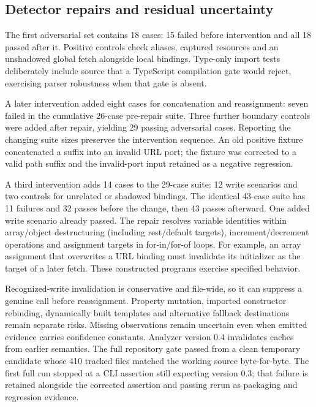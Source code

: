 \subsection{Detector repairs and residual uncertainty}
The first adversarial set contains 18 cases: 15 failed before intervention and all 18 passed after it. Positive controls check aliases, captured resources and an unshadowed global fetch alongside local bindings. Type-only import tests deliberately include source that a TypeScript compilation gate would reject, exercising parser robustness when that gate is absent.

A later intervention added eight cases for concatenation and reassignment: seven failed in the cumulative 26-case pre-repair suite. Three further boundary controls were added after repair, yielding 29 passing adversarial cases. Reporting the changing suite sizes preserves the intervention sequence. An old positive fixture concatenated a suffix into an invalid URL port; the fixture was corrected to a valid path suffix and the invalid-port input retained as a negative regression.

A third intervention adds 14 cases to the 29-case suite: 12 write scenarios and two controls for unrelated or shadowed bindings. The identical 43-case suite has 11 failures and 32 passes before the change, then 43 passes afterward. One added write scenario already passed. The repair resolves variable identities within array/object destructuring (including rest/default targets), increment/decrement operations and assignment targets in for-in/for-of loops. For example, an array assignment that overwrites a URL binding must invalidate its initializer as the target of a later fetch. These constructed programs exercise specified behavior.

Recognized-write invalidation is conservative and file-wide, so it can suppress a genuine call before reassignment. Property mutation, imported constructor rebinding, dynamically built templates and alternative fallback destinations remain separate risks. Missing observations remain uncertain even when emitted evidence carries confidence constants. Analyzer version 0.4 invalidates caches from earlier semantics. The full repository gate passed from a clean temporary candidate whose 410 tracked files matched the working source byte-for-byte. The first full run stopped at a CLI assertion still expecting version 0.3; that failure is retained alongside the corrected assertion and passing rerun as packaging and regression evidence.

